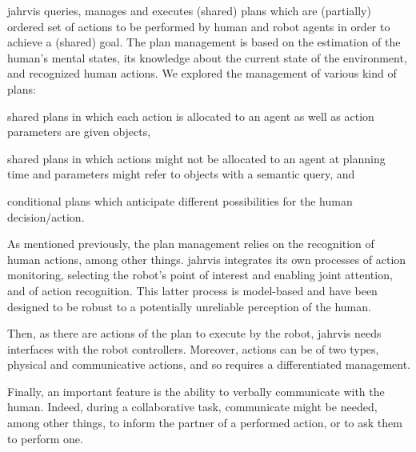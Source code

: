 \documentclass[a4paper,11pt,twoside]{StyleThese}
\begin{document}
\acrshort{jahrvis} queries, manages and executes (shared) plans which are (partially) ordered set of actions to be performed by human and robot agents in order to achieve a (shared) goal. The plan management is based on the estimation of the human's mental states, its knowledge about the current state of the environment, and recognized human actions. We explored the management of various kind of plans: 
\begin{inlineEnumerate}
	\item shared plans in which each action is allocated to an agent as well as action parameters are given objects,
	\item shared plans in which actions might not be allocated to an agent at planning time and parameters might refer to objects with a semantic query, and
	\item conditional plans which anticipate different possibilities for the human decision/action. 
\end{inlineEnumerate} 

As mentioned previously, the plan management relies on the recognition of human actions, among other things. \acrshort{jahrvis} integrates its own processes of action monitoring, \ie selecting the robot's point of interest and enabling joint attention, and of action recognition. This latter process is model-based and have been designed to be robust to a potentially unreliable perception of the human. 

Then, as there are actions of the plan to execute by the robot, \acrshort{jahrvis} needs interfaces with the robot controllers. Moreover, actions can be of two types, physical and communicative actions, and so requires a differentiated management. 

Finally, an important feature is the ability to verbally communicate with the human. Indeed, during a collaborative task, communicate might be needed, among other things, to inform the partner of a performed action, or to ask them to perform one. 

\end{document}
